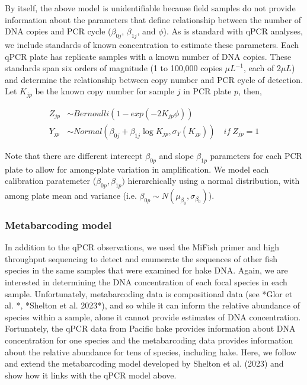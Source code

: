 \documentclass{article}
\begin{document}
By itself, the above model is unidentifiable because field samples do not provide information about the parameters that define relationship between the number of DNA copies and PCR cycle ($\beta_{0j}$, $\beta_{1j}$, and $\phi$). As is standard with qPCR analyses, we include standards of known concentration to estimate these parameters. Each qPCR plate has replicate samples with a known number of DNA copies. These standards span six orders of magnitude (1 to 100,000 copies $\mu L^{-1}$, each of 2$\mu L$) and determine the relationship between copy number and PCR cycle of detection. Let $K_{jp}$ be the known copy number for sample $j$ in PCR plate $p$, then,

\begin{align}
  Z_{jp} &\sim Bernoulli \left(1-exp(-2 K_{jp} \phi) \right)\\
  Y_{jp} &\sim Normal \left(\beta_{0j}+\beta_{1j}\log{K_{jp}},\sigma_Y(K_{jp})\right) \quad  if \: Z_{jp} =1
\end{align}

Note that there are different intercept $\beta_{0p}$ and slope $\beta_{1p}$ parameters for each PCR plate to allow for among-plate variation in amplification. We model each calibration paratemeter ($\beta_{0p},\beta_{1p})$ hierarchically using a normal distribution, with among plate mean and variance (i.e. $\beta_{0p} \sim N(\mu_{\beta_{0}},\sigma_{\beta_{0}})$).

\subsubsection*{Metabarcoding model}

In addition to the qPCR observations, we used the MiFish primer and high throughput sequencing to detect and enumerate the sequences of other fish species in the same samples that were examined for hake DNA. Again, we are interested in determining the DNA concentration of each focal species in each sample. Unfortunately, metabarcoding data is compositional data (see *Glor et al. *, *Shelton et al. 2023*), and so while it can inform the relative abundance of species within a sample, alone it cannot provide estimates of DNA concentration. Fortunately, the qPCR data from Pacific hake provides information about DNA concentration for one species and the metabarcoding data provides information about the relative abundance for tens of species, including hake. Here, we follow and extend the metabarcoding model developed by Shelton et al. (2023) and show how it links with the qPCR model above. 
\end{document}
